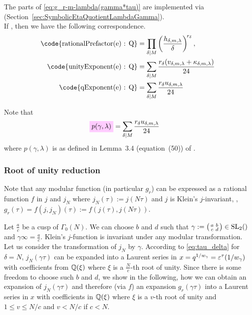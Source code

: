 \documentclass{article}
\begin{document}
The parts of \eqref{eq:g_r-m-lambda(gamma*tau)} are implemented via
\textcolor{blue}{}
(Section~\ref{sec:SymbolicEtaQuotientLambdaGamma}).
\\
If , then we have the
following correspondence.
\begin{align*}
  \text{\code{rationalPrefactor(e) : Q}}
  &=
    \divisorprod{M}
    \left(\frac{h_{\delta,m,\lambda}}{\delta}\right)^{\!r_\delta},
  \\
  \text{\code{unityExponent(e) : Q}}
  &=
    \divisorsum{M} \frac{r_\delta(v_{\delta,m,\lambda} + \kappa_{\delta,m,\lambda})}{24}
  \\
  \text{\code{qExponent(e) : Q}}
  &=
    \divisorsum{M} \frac{r_\delta u_{\delta,m,\lambda}}{24}
\end{align*}

Note that
\begin{align}
  \defineNotation[p-gamma-lambda]{p(\gamma,\lambda)}
  &=
    \divisorsum{M} \frac{r_\delta u_{\delta,m,\lambda}}{24}
\end{align}
where $p(\gamma,\lambda)$ is as defined in Lemma~3.4 (equation~(50))
of \cite{Radu_AlgorithmicApproachRamanujanCongruences_2009}.







\subsubsection{Root of unity reduction}

Note that any modular function (in particular $g_r$) can be expressed
as a rational function $f$ in $j$ and $j_N$ where
$j_N(\tau):=j(N\tau)$ and $j$ is Klein's $j$-invariant, \ie,
$g_r(\tau)=f(j, j_N)(\tau) := f(j(\tau), j(N\tau))$.

Let $\frac{a}{c}$ be a cusp of $\Gamma_0(N)$.
%
We can choose $b$ and $d$ such that
%
$\gamma := \bigl(
\begin{smallmatrix}
  a & b\\
  c & d
\end{smallmatrix}
\bigr) \in \SL2Z$ and $\gamma\infty=\frac{a}{c}$.
%
Klein's $j$-function is invariant under any modular transformation.
%
Let us consider the transformation of $j_N$ by $\gamma$.
%
According to \eqref{eq:tau_delta} for $\delta=N$, $j_N(\gamma\tau)$
can be expanded into a Laurent series in
$x=q^{1/w_\gamma}=\varepsilon^\tau\!\left(1/w_\gamma\right)$ with
coefficients from $\mathbb{Q}(\xi)$ where $\xi$ is a $\frac{N}{c}$-th root
of unity.
%
Since there is some freedom to choose such $b$ and $d$, we show in the
following, how we can obtain an expansion of $j_N(\gamma\tau)$ and
therefore (via $f$) an expansion $g_r(\gamma\tau)$ into a Laurent
series in $x$ with coefficients in $\mathbb{Q}(\xi)$ where $\xi$ is a
$v$-th root of unity and $1 \leq v \le N/c$ and $v<N/c$ if $c<N$.
\end{document}
